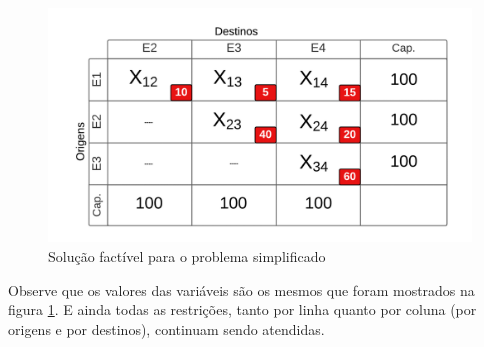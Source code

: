 \begin{figure}[h]
	\begin{center}
		\includegraphics[scale=0.4]{img/fig3.png}
		\caption{Solução factível para o problema simplificado}
		\label{fig: fig3}
	\end{center}
\end{figure}

Observe que os valores das variáveis são os mesmos que foram mostrados na figura \ref{fig: fig3}. E ainda todas as restrições, tanto por linha quanto por coluna (por origens e por destinos), continuam sendo atendidas.


